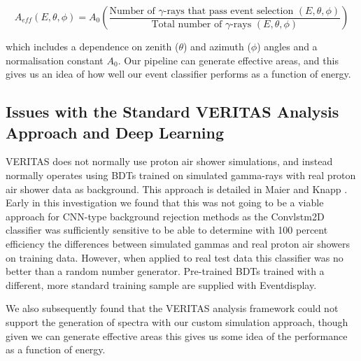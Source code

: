 \begin{equation}
    A_{eff}(E,\theta,\phi)=A_0\left(\frac{\textrm{Number of }\gamma\textrm{-rays that pass event selection }(E,\theta,\phi)}{\textrm{Total number of }\gamma\textrm{-rays }(E,\theta,\phi)}\right)
\end{equation}

which includes a dependence on zenith ($\theta$) and azimuth ($\phi$) angles and a normalisation constant $A_0$. Our pipeline can generate effective areas, and this gives us an idea of how well our event classifier performs as a function of energy.

\subsection{Issues with the Standard VERITAS Analysis Approach and Deep Learning}
VERITAS does not normally use proton air shower simulations, and instead normally operates using BDTs trained on simulated gamma-rays with real proton air shower data as background. This approach is detailed in Maier and Knapp \cite{maierknapp}. Early in this investigation we found that this was not going to be a viable approach for CNN-type background rejection methods as the Convlstm2D classifier was sufficiently sensitive to be able to determine with 100 percent efficiency the differences between simulated gammas and real proton air showers on training data. However, when applied to real test data this classifier was no better than a random number generator. Pre-trained BDTs trained with a different, more standard training sample are supplied with Eventdisplay.

We also subsequently found that the VERITAS analysis framework could not support the generation of spectra with our custom simulation approach, though given we can generate effective areas this gives us some idea of the performance as a function of energy.

